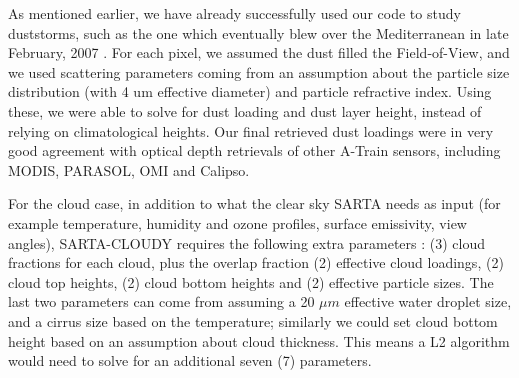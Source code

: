 \documentclass[11pt]{article}
\newcommand{\sa}{\textsf{SARTA}\xspace}
\newcommand{\sasc}{\textsf{SARTA-CLOUDY}\xspace}
\newcommand{\um}{$\mu m$\xspace}
\begin{document}
As mentioned earlier, we have already successfully used our code to
study duststorms, such as the one which eventually blew over the 
Mediterranean in late February, 2007 \cite{mac:10}. For each pixel, we assumed 
the dust filled the Field-of-View, and we used scattering parameters 
coming from an assumption about the particle size distribution (with 4 um 
effective diameter) and particle refractive index. Using these, we were able to solve 
for dust loading and dust layer height, instead of relying on 
climatological heights. Our final retrieved dust loadings were in very 
good agreement with optical depth retrievals of other A-Train sensors, including
MODIS, PARASOL, OMI and Calipso. 



For the cloud case, in addition to what the clear sky \sa needs as input
(for example temperature, humidity and ozone profiles, surface emissivity, 
view angles), \sasc requires the following extra parameters : (3) cloud fractions
for each cloud, plus the overlap fraction (2) effective cloud loadings, 
(2) cloud top heights, (2) cloud bottom heights and (2) effective particle sizes.
The last two parameters can come from assuming a 20 \um effective water droplet
size, and a cirrus size based on the temperature; similarly we could 
set cloud bottom height based on an assumption about cloud thickness. This means
a L2 algorithm would need to solve for an additional seven (7) parameters. 
 
\end{document}
